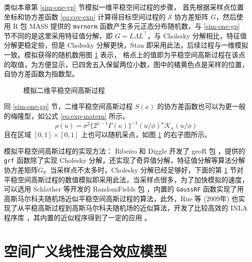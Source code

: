 \documentclass[12pt,a4paper,UTF8,twoside]{book}
\theoremstyle{definition}
\theoremstyle{definition}
\theoremstyle{definition}
\theoremstyle{remark}
\begin{document}
类似本章第 \ref{sim-one-gp} 节模拟一维平稳空间过程的步骤， 首先根据采样点位置坐标和协方差函数 \eqref{eq:cov-exp} 计算得目标空间过程的 \(\mathcal{S}\) 协方差矩阵 \(G\)，然后使用 R 包 MASS 提供的 \texttt{mvrnorm} 函数产生多元正态分布随机数，与 \ref{sim-one-gp} 节不同的是这里采用特征值分解，即 \(G = L\Lambda L^{\top}\)，与 Cholesky 分解相比，特征值分解更稳定些，但是 Cholesky 分解更快，Stan 即采用此法，后续过程与一维模拟一致。模拟获得的随机数用图 \ref{fig:sim-two-gp} 表示， 格点上的值即为平稳空间高斯过程在该点的取值，为方便显示，已四舍五入保留两位小数，图中的橘黄色点是采样的位置，自协方差函数为指数型。

\begin{figure}

{\centering {}

}

\caption{模拟二维平稳空间高斯过程}\label{fig:sim-two-gp}
\end{figure}

同 \ref{sim-one-gp} 节，二维平稳空间高斯过程 \(S(x)\) 的协方差函数也可以为更一般的梅隆型，如公式 \eqref{eq:exp-matern} 所示。
\begin{equation}
\rho(u) = \sigma^2 \{ 2^{\kappa -1} \Gamma(\kappa) \}^{-1}( u/\phi )^{\kappa} \mathcal{K}_{\kappa}( u / \phi ) \label{eq:exp-matern}
\end{equation}
\noindent 且在区域 \([0,1] \times [0,1]\) 上也可以随机采点，如图 \ref{fig:sim-two-gp} 的右子图所示。

模拟平稳空间高斯过程的实现方法： Ribeiro 和 Diggle 开发了 geoR 包 \citep{geoR2001}，提供的 \texttt{grf} 函数除了实现 Cholesky 分解，还实现了奇异值分解，特征值分解等算法分解协方差矩阵\(G\)。当采样点不太多时，Cholesky 分解已经足够好，下面的第 \ref{sim-sglmm} 节对平稳空间高斯过程的数值模拟即采用此法，当采样点很多，为了加快模拟的速度，可以选用 Schlather 等开发的 RandomFields 包 \citep{RandomFields2015}，内置的 \texttt{GaussRF} 函数实现了用高斯马尔科夫随机场近似平稳空间高斯过程的算法，此外，Rue 等 (2009年) \citep{Rue2009} 也实现了从平稳高斯过程到高斯马尔科夫随机场的近似算法，开发了比较高效的 INLA 程序库 \citep{INLA2015}，其内置的近似程序得到了一定的应用 \citep{Blangiardo2015, Faraway2018}。

\hypertarget{sim-sglmm}{%
\section{空间广义线性混合效应模型}\label{sim-sglmm}}
\end{document}
